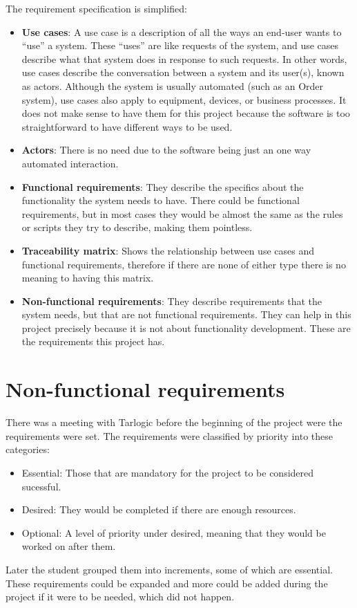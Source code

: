 \linej
\linej
The requirement specification is simplified:
\begin{itemize}
	\item \textbf{Use cases}: A use case is a description of all the ways an end-user wants to ``use'' a system. These ``uses'' are like requests of the system, and use cases describe what that system does in response to such requests. In other words, use cases describe the conversation between a system and its user(s), known as actors. Although the system is usually automated (such as an Order system), use cases also apply to equipment, devices, or business processes\cite{use_case_definition}. It does not make sense to have them for this project because the software is too straightforward to have different ways to be used.
	\item \textbf{Actors}: There is no need due to the software being just an one way automated interaction.
	\item \textbf{Functional requirements}: They describe the specifics about the functionality the system needs to have. There could be functional requirements, but in most cases they would be almost the same as the rules or scripts they try to describe, making them pointless.
	\item \textbf{Traceability matrix}: Shows the relationship between use cases and functional requirements, therefore if there are none of either type there is no meaning to having this matrix.
	\item \textbf{Non-functional requirements}: They describe requirements that the system needs, but that are not functional requirements. They can help in this project precisely because it is not about functionality development. These are the requirements this project has.
\end{itemize}

\section{Non-functional requirements}
There was a meeting with Tarlogic before the beginning of the project were the requirements were set.
The requirements were classified by priority into these categories:
\begin{itemize}
	\item Essential: Those that are mandatory for the project to be considered sucessful.
	\item Desired: They would be completed if there are enough resources.
	\item Optional: A level of priority under desired, meaning that they would be worked on after them.
\end{itemize}
\linej
Later the student grouped them into increments, some of which are essential.
\linej
\linej
These requirements could be expanded and more could be added during the project if it were to be needed, which did not happen.

